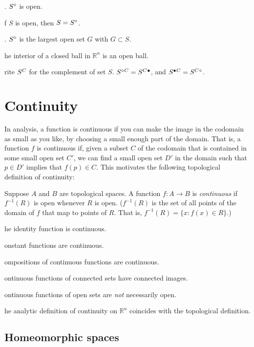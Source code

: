 \documentclass{article}
\def\R{{\mathbb R}}
\def\Rn{{\R^n}}
\newcounter{exercisecounter}\setcounter{exercisecounter}{1}
\def\Exercise.#1\par{{\item\small {\bf Exercise \number\theexercisecounter}.#1\addtocounter{exercisecounter}{1}}}
\def\comp#1{\smash{#1}^C\vphantom{#1}}
\def\inter#1{\smash{#1}^\circ\vphantom{#1}}
\def\clos#1{\smash{#1}^\bullet\vphantom{#1}}
\def\closcomp#1{\clos{\comp{#1}}}
\def\compclos#1{\comp{\clos{#1}}}
\def\intercomp#1{\inter{\comp{#1}}}
\def\compinter#1{\comp{\inter{#1}}}
\begin{document}
\begin{itemize}
\Exercise. $\inter S$ is open.

\Exercise. If $S$ is open, then $S = \inter S$.

\Exercise. $\inter S$ is the largest open set $G$ with $G\subset S$.

\Exercise. The interior of a closed ball in $\Rn$ is an open ball.  

\Exercise. Write $\comp S$ for the complement of set $S$.  $\compinter S = \closcomp S$, and
$\compclos S = \intercomp S$.

\end{itemize}

\section*{Continuity}

In analysis, a function is continuous if you can make the image in the
codomain as small as you like, by choosing a small enough part of the
domain.  That is, a function $f$ is continuous if, given a subset $C$
of the codomain that is contained in some small open set $C'$, we can
find a small open set $D'$ in the domain such that $p\in D'$ implies
that $f(p)\in C$.  This motivates the following topological definition
of continuity:

Suppose $A$ and $B$ are topological spaces.  A function $f : A\to B$
is {\em continuous\/} if $f^{-1}(R)$ is open whenever $R$ is open.
($f^{-1}(R)$ is the set of all points of the domain of $f$ that map to
points of $R$.  That is, $f^{-1}(R) = \{ x : f(x)\in R \}$.)

\begin{itemize}
\Exercise. The identity function is continuous.

\Exercise. Constant functions are continuous.

\Exercise. Compositions of continuous functions are continuous.

\Exercise. Continuous functions of connected sets have connected images.

\Exercise. Continuous functions of open sets are {\em not\/} necessarily open.

\Exercise. The analytic definition of continuity on $\Rn$ coincides with the
topological definition.

\end{itemize}

\subsection*{Homeomorphic spaces}
\end{document}
